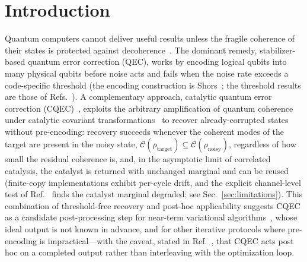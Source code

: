 \documentclass[pra,twocolumn,superscriptaddress,longbibliography,floatfix,nofootinbib]{revtex4-2}
\newcommand{\CC}{\mathcal{C}}
\newcommand{\rhot}{\rho_\mathrm{target}}
\newcommand{\rhon}{\rho_\mathrm{noisy}}
\begin{document}
 
\section{Introduction}
\label{sec:introduction}

Quantum computers cannot deliver useful results unless the fragile coherence of their states is protected against decoherence~\cite{NielsenChuang2010}.
The dominant remedy, stabilizer-based quantum error correction (QEC), works by encoding logical qubits into many physical qubits before noise acts and fails when the noise rate exceeds a code-specific threshold (the encoding construction is Shor\textquotesingle s~\cite{Shor1995}; the threshold results are those of Refs.~\cite{Gottesman1997,Knill2005}).
A complementary approach, catalytic quantum error correction (CQEC)~\cite{Wakaura2026unified}, exploits the arbitrary amplification of quantum coherence under catalytic covariant transformations~\cite{Takagi2022correlation,Shiraishi2024} to recover already-corrupted states without pre-encoding: recovery succeeds whenever the coherent modes of the target are present in the noisy state, $\CC(\rhot) \subseteq \CC(\rhon)$, regardless of how small the residual coherence is, and, in the asymptotic limit of correlated catalysis, the catalyst is returned with unchanged marginal and can be reused~\cite{Shiraishi2024,Wakaura2026unified} (finite-copy implementations exhibit per-cycle drift, and the explicit channel-level test of Ref.~\cite{Wakaura2026unified} finds the catalyst marginal degraded; see Sec.~\ref{sec:limitations}).
This combination of threshold-free recovery and post-hoc applicability suggests CQEC as a candidate post-processing step for near-term variational algorithms~\cite{Peruzzo2014,Cerezo2021}, whose ideal output is not known in advance, and for other iterative protocols where pre-encoding is impractical---with the caveat, stated in Ref.~\cite{Wakaura2026unified}, that CQEC acts post hoc on a completed output rather than interleaving with the optimization loop.
\end{document}
